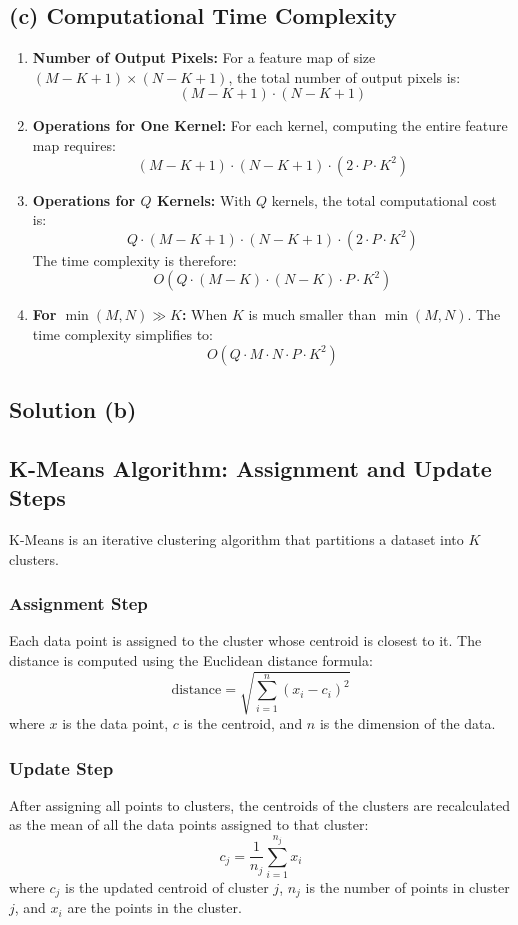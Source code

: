 \documentclass{article}
\begin{document}
\subsection*{(c) Computational Time Complexity}
\begin{enumerate}
    \item \textbf{Number of Output Pixels:} For a feature map of size \((M - K + 1) \times (N - K + 1)\), the total number of output pixels is:
    \[
    (M - K + 1) \cdot (N - K + 1)
    \]
    \item \textbf{Operations for One Kernel:} For each kernel, computing the entire feature map requires:
    \[
    (M - K + 1) \cdot (N - K + 1) \cdot (2 \cdot P \cdot K^2)
    \]
    \item \textbf{Operations for \( Q \) Kernels:} With \( Q \) kernels, the total computational cost is:
    \[
    Q \cdot (M - K + 1) \cdot (N - K + 1) \cdot (2 \cdot P \cdot K^2)
    \]
    The time complexity is therefore:
    \[
    O(Q \cdot (M - K) \cdot (N - K) \cdot P \cdot K^2)
    \]
    \item \textbf{For \( \min(M, N) \gg K \):} When \( K \) is much smaller than \( \min(M, N) \). The time complexity simplifies to:
    \[
    O(Q \cdot M \cdot N \cdot P \cdot K^2)
    \]
\end{enumerate}


\vspace{10pt}
\subsection*{Solution (b)}
\subsection*{K-Means Algorithm: Assignment and Update Steps}

K-Means is an iterative clustering algorithm that partitions a dataset into $K$ clusters.

\subsubsection*{Assignment Step}
Each data point is assigned to the cluster whose centroid is closest to it. The distance is computed using the Euclidean distance formula:
\[
\text{distance} = \sqrt{\sum_{i=1}^{n} (x_i - c_i)^2}
\]
where $x$ is the data point, $c$ is the centroid, and $n$ is the dimension of the data.

\subsubsection*{Update Step}
After assigning all points to clusters, the centroids of the clusters are recalculated as the mean of all the data points assigned to that cluster:
\[
c_j = \frac{1}{n_j} \sum_{i=1}^{n_j} x_i
\]
where $c_j$ is the updated centroid of cluster $j$, $n_j$ is the number of points in cluster $j$, and $x_i$ are the points in the cluster.
\end{document}
